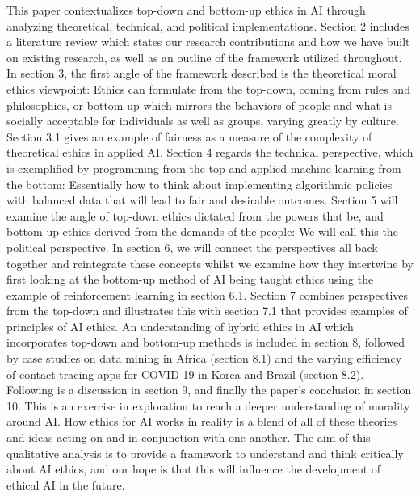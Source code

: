 \documentclass{svproc}
\begin{document}
This paper contextualizes top-down and bottom-up ethics in AI through analyzing theoretical, technical, and political implementations. Section 2 includes a literature review which states our research contributions and how we have built on existing research, as well as an outline of the framework utilized throughout. In section 3, the first angle of the framework described is the theoretical moral ethics viewpoint: Ethics can formulate from the top-down, coming from rules and philosophies, or bottom-up which mirrors the behaviors of people and what is socially acceptable for individuals as well as groups, varying greatly by culture. Section 3.1 gives an example of fairness as a measure of the complexity of theoretical ethics in applied AI. Section 4 regards the technical perspective, which is exemplified by programming from the top and applied machine learning from the bottom: Essentially how to think about implementing algorithmic policies with balanced data that will lead to fair and desirable outcomes. Section 5 will examine the angle of top-down ethics dictated from the powers that be, and bottom-up ethics derived from the demands of the people: We will call this the political perspective. In section 6, we will connect the perspectives all back together and reintegrate these concepts whilst we examine how they intertwine by first looking at the bottom-up method of AI being taught ethics using the example of reinforcement learning in section 6.1. Section 7 combines perspectives from the top-down and illustrates this with section 7.1 that provides examples of principles of AI ethics. An understanding of hybrid ethics in AI which incorporates top-down and bottom-up methods is included in section 8, followed by case studies on data mining in Africa (section 8.1) and the varying efficiency of contact tracing apps for COVID-19 in Korea and Brazil (section 8.2). Following is a discussion in section 9, and finally the paper's conclusion in section 10. This is an exercise in exploration to reach a deeper understanding of morality around AI. How ethics for AI works in reality is a blend of all of these theories and ideas acting on and in conjunction with one another. The aim of this qualitative analysis is to provide a framework to understand and think critically about AI ethics, and our hope is that this will influence the development of ethical AI in the future.
\end{document}
